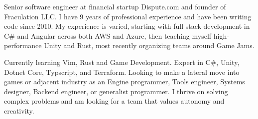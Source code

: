 

\begin{cvparagraph}

Senior software engineer at financial startup Dispute.com and founder of Fraculation LLC.\@
I have 9 years of professional experience and have been writing code since 2010. My experience is varied, starting with 
full stack development in C\# and Angular across both AWS and Azure, then teaching myself high-performance Unity and Rust,
most recently organizing teams around Game Jams.

Currently learning Vim, Rust and Game Development. Expert in C\#, Unity, Dotnet Core, Typscript, and Terraform.
Looking to make a lateral move into games or adjacent industry as an Engine programmer, 
Tools engineer,  Systems designer, Backend engineer, or generalist programmer.
I thrive on solving complex problems and am looking for a team that values autonomy and creativity.

\end{cvparagraph}

